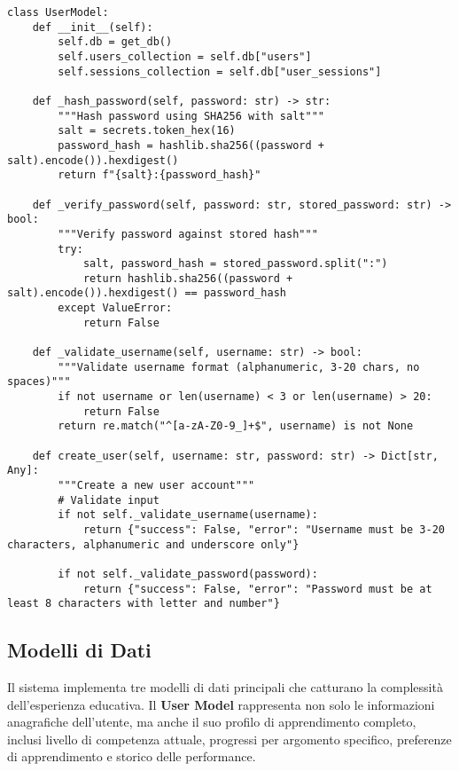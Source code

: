 \documentclass[12pt,a4paper]{article}
\begin{document}
\begin{lstlisting}[style=pythonstyle, caption=Sistema di Autenticazione - User Model, label=lst:usermodel]
class UserModel:
    def __init__(self):
        self.db = get_db()
        self.users_collection = self.db["users"]
        self.sessions_collection = self.db["user_sessions"]
        
    def _hash_password(self, password: str) -> str:
        """Hash password using SHA256 with salt"""
        salt = secrets.token_hex(16)
        password_hash = hashlib.sha256((password + salt).encode()).hexdigest()
        return f"{salt}:{password_hash}"
    
    def _verify_password(self, password: str, stored_password: str) -> bool:
        """Verify password against stored hash"""
        try:
            salt, password_hash = stored_password.split(":")
            return hashlib.sha256((password + salt).encode()).hexdigest() == password_hash
        except ValueError:
            return False
    
    def _validate_username(self, username: str) -> bool:
        """Validate username format (alphanumeric, 3-20 chars, no spaces)"""
        if not username or len(username) < 3 or len(username) > 20:
            return False
        return re.match("^[a-zA-Z0-9_]+$", username) is not None
    
    def create_user(self, username: str, password: str) -> Dict[str, Any]:
        """Create a new user account"""
        # Validate input
        if not self._validate_username(username):
            return {"success": False, "error": "Username must be 3-20 characters, alphanumeric and underscore only"}
        
        if not self._validate_password(password):
            return {"success": False, "error": "Password must be at least 8 characters with letter and number"}
\end{lstlisting}

\subsection{Modelli di Dati}

Il sistema implementa tre modelli di dati principali che catturano la complessità dell'esperienza educativa. Il \textbf{User Model} rappresenta non solo le informazioni anagrafiche dell'utente, ma anche il suo profilo di apprendimento completo, inclusi livello di competenza attuale, progressi per argomento specifico, preferenze di apprendimento e storico delle performance.
\end{document}
